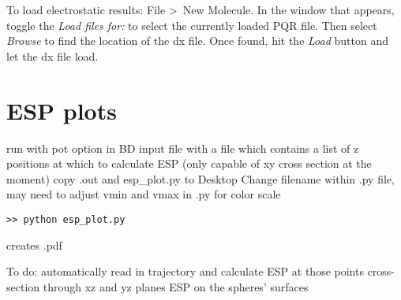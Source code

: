 To load electrostatic results: File \textgreater \, New Molecule. In the window that appears, toggle the \textit{Load files for:} 
to select the currently loaded PQR file. Then select \textit{Browse} to find the location of the dx file. Once found, hit 
the \textit{Load} button and let the dx file load.

 \clearpage

%
%
%


\section{ESP plots}
run with pot option in BD input file
with a file which contains a list of z positions at which to calculate ESP
(only capable of xy cross section at the moment)
copy .out and esp\_plot.py to Desktop
Change filename within .py file, may need to adjust vmin and vmax in .py for color scale
\begin{lstlisting}[style = MyBash]
>> python esp_plot.py
\end{lstlisting}

creates .pdf

To do: automatically read in trajectory and calculate ESP at those points
	cross-section through xz and yz planes
	ESP on the spheres' surfaces
	
	
	

